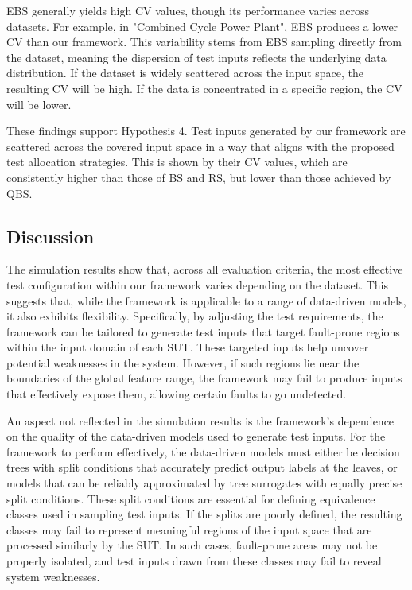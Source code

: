 \documentclass[
]{ceurart}
\theoremstyle{definition}
\begin{document}
EBS generally yields high CV values, though its performance varies across datasets. For example, in "Combined Cycle Power Plant", EBS produces a lower CV than our framework. This variability stems from EBS sampling directly from the dataset, meaning the dispersion of test inputs reflects the underlying data distribution. If the dataset is widely scattered across the input space, the resulting CV will be high. If the data is concentrated in a specific region, the CV will be lower.

These findings support Hypothesis 4. Test inputs generated by our framework are scattered across the covered input space in a way that aligns with the proposed test allocation strategies. This is shown by their CV values, which are consistently higher than those of BS and RS, but lower than those achieved by QBS.

\subsection{Discussion}

The simulation results show that, across all evaluation criteria, the most effective test configuration within our framework varies depending on the dataset. This suggests that, while the framework is applicable to a range of data-driven models, it also exhibits flexibility. Specifically, by adjusting the test requirements, the framework can be tailored to generate test inputs that target fault-prone regions within the input domain of each SUT. These targeted inputs help uncover potential weaknesses in the system. However, if such regions lie near the boundaries of the global feature range, the framework may fail to produce inputs that effectively expose them, allowing certain faults to go undetected.

An aspect not reflected in the simulation results is the framework’s dependence on the quality of the data-driven models used to generate test inputs. For the framework to perform effectively, the data-driven models must either be decision trees with split conditions that accurately predict output labels at the leaves, or models that can be reliably approximated by tree surrogates with equally precise split conditions. These split conditions are essential for defining equivalence classes used in sampling test inputs. If the splits are poorly defined, the resulting classes may fail to represent meaningful regions of the input space that are processed similarly by the SUT. In such cases, fault-prone areas may not be properly isolated, and test inputs drawn from these classes may fail to reveal system weaknesses.
\end{document}
